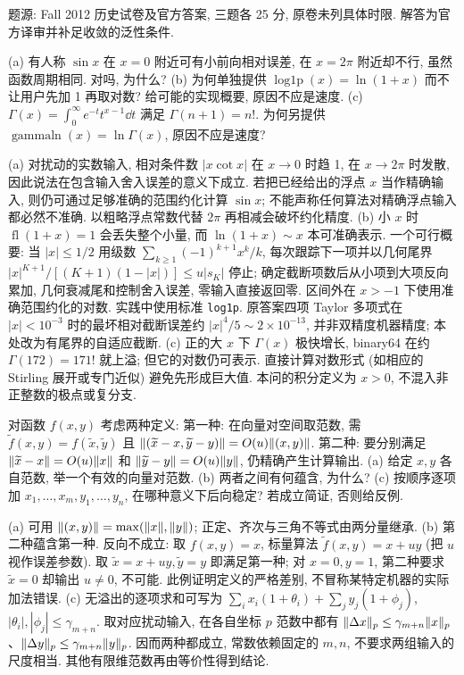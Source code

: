 题源: Fall 2012 历史试卷及官方答案, 三题各 25 分, 原卷未列具体时限. 解答为官方译审并补足收敛的泛性条件.
\begin{exercise}\label{e2012:q1}
(a) 有人称 $\sin x$ 在 $x=0$ 附近可有小前向相对误差, 在 $x=2\pi$ 附近却不行, 虽然函数周期相同. 对吗, 为什么?
(b) 为何单独提供 $\operatorname{log1p}(x)=\ln(1+x)$ 而不让用户先加 1 再取对数? 给可能的实现概要, 原因不应是速度.
(c) $\Gamma(x)=\int_0^\infty e^{-t}t^{x-1}\dd t$ 满足 $\Gamma(n+1)=n!$. 为何另提供 $\operatorname{gammaln}(x)=\ln\Gamma(x)$, 原因不应是速度?
\end{exercise}
\begin{solution}
(a) 对扰动的实数输入, 相对条件数 $|x\cot x|$ 在 $x\to0$ 时趋 1, 在 $x\to2\pi$ 时发散, 因此说法在包含输入舍入误差的意义下成立. 若把已经给出的浮点 $x$ 当作精确输入, 则仍可通过足够准确的范围约化计算 $\sin x$; 不能声称任何算法对精确浮点输入都必然不准确. 以粗略浮点常数代替 $2\pi$ 再相减会破坏约化精度.
(b) 小 $x$ 时 $\operatorname{fl}(1+x)=1$ 会丢失整个小量, 而 $\ln(1+x)\sim x$ 本可准确表示. 一个可行概要: 当 $|x|\le1/2$ 用级数 $\sum_{k\ge1}(-1)^{k+1}x^k/k$, 每次跟踪下一项并以几何尾界 $|x|^{K+1}/[(K+1)(1-|x|)]\le u|s_K|$ 停止; 确定截断项数后从小项到大项反向累加, 几何衰减尾和控制舍入误差, 零输入直接返回零. 区间外在 $x>-1$ 下使用准确范围约化的对数. 实践中使用标准 \texttt{log1p}. 原答案四项 Taylor 多项式在 $|x|<10^{-3}$ 时的最坏相对截断误差约 $|x|^4/5\sim2\times10^{-13}$, 并非双精度机器精度; 本处改为有尾界的自适应截断.
(c) 正的大 $x$ 下 $\Gamma(x)$ 极快增长, binary64 在约 $\Gamma(172)=171!$ 就上溢; 但它的对数仍可表示. 直接计算对数形式 (如相应的 Stirling 展开或专门近似) 避免先形成巨大值. 本问的积分定义为 $x>0$, 不混入非正整数的极点或复分支.
\end{solution}
\begin{exercise}\label{e2012:q2}
对函数 $f(x,y)$ 考虑两种定义:
第一种: 在向量对空间取范数, 需 $\widetilde f(x,y)=f(\widetilde x,\widetilde y)$ 且 $\lVert (\widetilde x-x,\widetilde y-y)\rVert=O(u)\lVert (x,y)\rVert$.
第二种: 要分别满足 $\lVert \widetilde x-x\rVert=O(u)\lVert x\rVert$ 和 $\lVert \widetilde y-y\rVert=O(u)\lVert y\rVert$, 仍精确产生计算输出.
(a) 给定 $x,y$ 各自范数, 举一个有效的向量对范数.
(b) 两者之间有何蕴含, 为什么?
(c) 按顺序逐项加 $x_1,\ldots,x_m,y_1,\ldots,y_n$, 在哪种意义下后向稳定? 若成立简证, 否则给反例.
\end{exercise}
\begin{solution}
(a) 可用 $\lVert (x,y)\rVert=\max(\lVert x\rVert,\lVert y\rVert)$; 正定、齐次与三角不等式由两分量继承.
(b) 第二种蕴含第一种. 反向不成立: 取 $f(x,y)=x$, 标量算法 $\widetilde f(x,y)=x+uy$ (把 $u$ 视作误差参数). 取 $\widetilde x=x+uy,\widetilde y=y$ 即满足第一种; 对 $x=0,y=1$, 第二种要求 $\widetilde x=0$ 却输出 $u\ne0$, 不可能. 此例证明定义的严格差别, 不冒称某特定机器的实际加法错误.
(c) 无溢出的逐项求和可写为 $\sum_i x_i(1+\theta_i)+\sum_j y_j(1+\phi_j)$, $|\theta_i|,|\phi_j|\le\gamma_{m+n}$. 取对应扰动输入, 在各自坐标 $p$ 范数中都有 $\lVert \Delta x\rVert_p\le\gamma_{m+n}\lVert x\rVert_p$、$\lVert \Delta y\rVert_p\le\gamma_{m+n}\lVert y\rVert_p$. 因而两种都成立, 常数依赖固定的 $m,n$, 不要求两组输入的尺度相当. 其他有限维范数再由等价性得到结论.
\end{solution}
